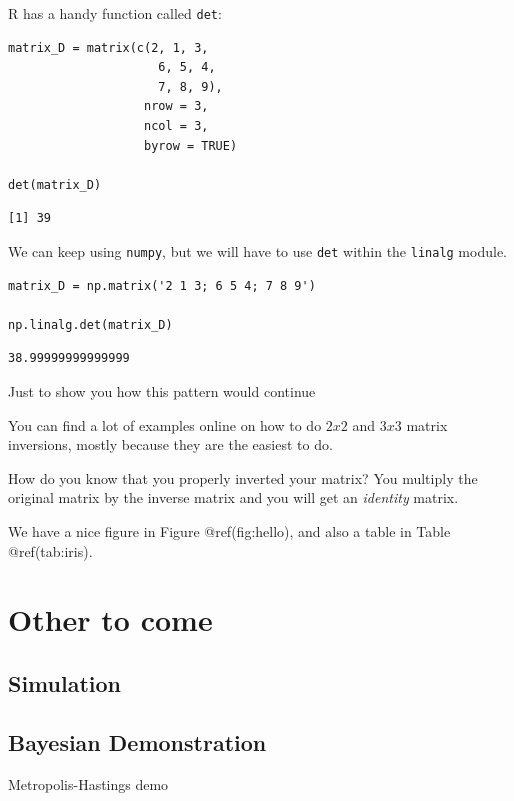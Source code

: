 \documentclass[
  letterpaper,
]{krantz}
\begin{document}
R has a handy function called \texttt{det}:

\begin{verbatim}
matrix_D = matrix(c(2, 1, 3,
                     6, 5, 4,
                     7, 8, 9), 
                   nrow = 3, 
                   ncol = 3, 
                   byrow = TRUE)

det(matrix_D)
\end{verbatim}

\begin{verbatim}
[1] 39
\end{verbatim}

We can keep using \texttt{numpy}, but we will have to use \texttt{det}
within the \texttt{linalg} module.

\begin{verbatim}
matrix_D = np.matrix('2 1 3; 6 5 4; 7 8 9')

np.linalg.det(matrix_D)
\end{verbatim}

\begin{verbatim}
38.99999999999999
\end{verbatim}

Just to show you how this pattern would continue

You can find a lot of examples online on how to do \(2x2\) and \(3x3\)
matrix inversions, mostly because they are the easiest to do.

How do you know that you properly inverted your matrix? You multiply the
original matrix by the inverse matrix and you will get an
\emph{identity} matrix.

We have a nice figure in Figure @ref(fig:hello), and also a table in
Table @ref(tab:iris).

\chapter{Other to come}\label{other-to-come}

\section{Simulation}\label{simulation}

\section{Bayesian Demonstration}\label{bayesian-demonstration}

Metropolis-Hastings demo
\end{document}
